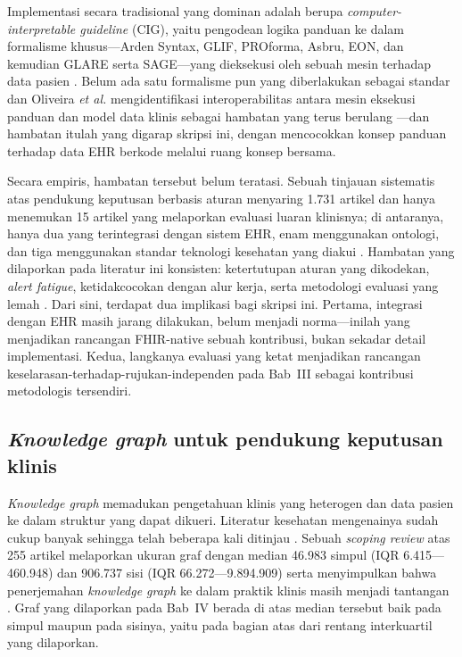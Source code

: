 Implementasi secara tradisional yang dominan adalah berupa \emph{computer-in\-ter\-pret\-able guideline} (CIG), yaitu
pengodean logika panduan ke dalam formalisme khusus---Arden Syntax, GLIF, PROforma, Asbru,
EON, dan kemudian GLARE serta SAGE---yang dieksekusi oleh sebuah mesin terhadap data pasien
\cite{declercq2004,declercq2008,oliveira2014}. Belum ada satu formalisme pun yang diberlakukan
sebagai standar \cite{declercq2008} dan Oliveira \textit{et al.}
mengidentifikasi interoperabilitas antara mesin eksekusi panduan dan model data klinis
sebagai hambatan yang terus berulang \cite{oliveira2014}---dan hambatan
itulah yang digarap skripsi ini, dengan mencocokkan konsep panduan terhadap data EHR berkode
melalui ruang konsep bersama.

Secara empiris, hambatan tersebut belum teratasi. Sebuah tinjauan sistematis atas pendukung
keputusan berbasis aturan menyaring 1.731 artikel dan hanya menemukan
15 artikel yang melaporkan evaluasi luaran klinisnya; di antaranya,
hanya dua yang terintegrasi dengan sistem EHR, enam menggunakan ontologi, dan
tiga menggunakan standar teknologi kesehatan yang diakui
\cite{papadopoulos2022}. Hambatan yang dilaporkan pada literatur ini konsisten:
ketertutupan aturan yang dikodekan, \emph{alert fatigue}, ketidakcocokan dengan alur kerja,
serta metodologi evaluasi yang lemah
\cite{papadopoulos2022,bosetti2025,silva2022}. Dari sini, terdapat dua implikasi bagi skripsi
ini. Pertama, integrasi dengan EHR masih jarang dilakukan, belum menjadi norma---inilah yang
menjadikan rancangan FHIR-native sebuah kontribusi, bukan sekadar detail implementasi. Kedua,
langkanya evaluasi yang ketat menjadikan rancangan keselarasan-terhadap-rujukan-independen
pada Bab~III sebagai kontribusi metodologis tersendiri.

\subsection{\emph{Knowledge graph} untuk pendukung keputusan klinis}
\label{sec:rw-kg}
\emph{Knowledge graph} memadukan pengetahuan klinis yang heterogen dan data pasien ke dalam struktur yang dapat dikueri. Literatur kesehatan mengenainya sudah cukup banyak sehingga
telah beberapa kali ditinjau \cite{abusalih2023,cui_h2023,budhdeo2023}. Sebuah
\emph{scoping review} atas 255 artikel melaporkan ukuran graf dengan median
46.983 simpul (IQR 6.415---460.948) dan 906.737
sisi (IQR 66.272---9.894.909) serta menyimpulkan bahwa
penerjemahan \emph{knowledge graph} ke dalam praktik klinis masih menjadi
tantangan \cite{budhdeo2023}. Graf yang dilaporkan pada Bab~IV berada di atas median
tersebut baik pada simpul maupun pada sisinya, yaitu pada bagian atas dari rentang interkuartil yang dilaporkan.

